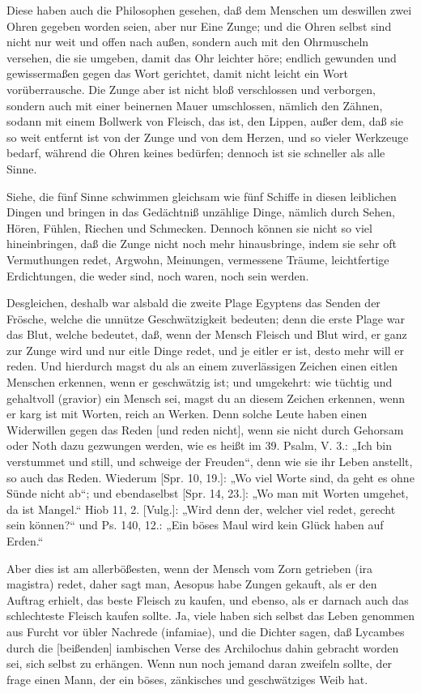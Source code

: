 Diese haben auch die Philosophen gesehen, daß dem Menschen um deswillen zwei Ohren gegeben worden seien, aber nur Eine Zunge; und die Ohren selbst sind nicht nur weit und offen nach außen, sondern auch mit den Ohrmuscheln versehen, die sie umgeben, damit das Ohr leichter höre; endlich gewunden und gewissermaßen gegen das Wort gerichtet, damit nicht leicht ein Wort vorüberrausche. Die Zunge aber ist nicht bloß verschlossen und verborgen, sondern auch mit einer beinernen Mauer umschlossen, nämlich den Zähnen, sodann mit einem Bollwerk von Fleisch, das ist, den Lippen, außer dem, daß sie so weit entfernt ist von der Zunge und von dem Herzen, und so vieler Werkzeuge bedarf, während die Ohren keines bedürfen; dennoch ist sie schneller als alle Sinne.

Siehe, die fünf Sinne schwimmen gleichsam wie fünf Schiffe in diesen leiblichen Dingen und bringen in das Gedächtniß unzählige Dinge, nämlich durch Sehen, Hören, Fühlen, Riechen und Schmecken. Dennoch können sie nicht so viel hineinbringen, daß die Zunge nicht noch mehr hinausbringe, indem sie sehr oft Vermuthungen redet, Argwohn, Meinungen, vermessene Träume, leichtfertige Erdichtungen, die weder sind, noch waren, noch sein werden.

Desgleichen, deshalb war alsbald die zweite Plage Egyptens das Senden der Frösche, welche die unnütze Geschwätzigkeit bedeuten; denn die erste Plage war das Blut, welche bedeutet, daß, wenn der Mensch Fleisch und Blut wird, er ganz zur Zunge wird und nur eitle Dinge redet, und je eitler er ist, desto mehr will er reden. Und hierdurch magst du als an einem zuverlässigen Zeichen einen eitlen Menschen erkennen, wenn er geschwätzig ist; und umgekehrt: wie tüchtig und gehaltvoll (gravior) ein Mensch sei, magst du an diesem Zeichen erkennen, wenn er karg ist mit Worten, reich an Werken. Denn solche Leute haben einen Widerwillen gegen das Reden [und reden nicht], wenn sie nicht durch Gehorsam oder Noth dazu gezwungen werden, wie es heißt im 39. Psalm, V. 3.: „Ich bin verstummet und still, und schweige der Freuden“, denn wie sie ihr Leben anstellt, so auch das Reden. Wiederum [Spr. 10, 19.]: „Wo viel Worte sind, da geht es ohne Sünde nicht ab“; und ebendaselbst [Spr. 14, 23.]: „Wo man mit Worten umgehet, da ist Mangel.“ Hiob 11, 2. [Vulg.]: „Wird denn der, welcher viel redet, gerecht sein können?“ und Ps. 140, 12.: „Ein böses Maul wird kein Glück haben auf Erden.“

Aber dies ist am allerbößesten, wenn der Mensch vom Zorn getrieben (ira magistra) redet, daher sagt man, Aesopus habe Zungen gekauft, als er den Auftrag erhielt, das beste Fleisch zu kaufen, und ebenso, als er darnach auch das schlechteste Fleisch kaufen sollte. Ja, viele haben sich selbst das Leben genommen aus Furcht vor übler Nachrede (infamiae), und die Dichter sagen, daß Lycambes durch die [beißenden] iambischen Verse des Archilochus dahin gebracht worden sei, sich selbst zu erhängen. Wenn nun noch jemand daran zweifeln sollte, der frage einen Mann, der ein böses, zänkisches und geschwätziges Weib hat.

